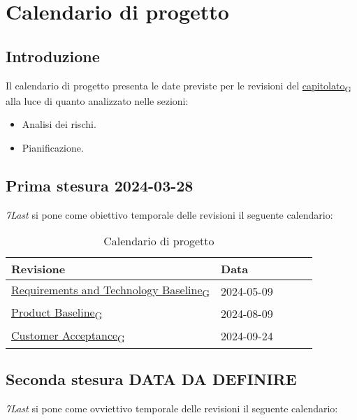 \section{Calendario di progetto}
\subsection{Introduzione}
Il calendario di progetto presenta le date previste per le revisioni del \href{https://7last.github.io/docs/rtb/documentazione-interna/glossario#capitolato}{capitolato\textsubscript{G}} alla luce di quanto analizzato nelle sezioni:
\begin{itemize}
    \item Analisi dei rischi. 
    \item Pianificazione.
\end{itemize}

\subsection{Prima stesura 2024-03-28}
\textit{7Last} si pone come obiettivo temporale delle revisioni il seguente calendario:
\begin{table}[!h]
    \begin{center}
        \begin{tabular}{ |l |l |l |l| l| }
            \hline 
            Revisione                               & Data       \\ \hline
            \href{https://7last.github.io/docs/rtb/documentazione-interna/glossario#requirements-and-technology-baseline}{Requirements and Technology Baseline\textsubscript{G}}    & 2024-05-09 \\
            \href{https://7last.github.io/docs/rtb/documentazione-interna/glossario#product-baseline}{Product Baseline\textsubscript{G}}                        & 2024-08-09 \\
            \href{https://7last.github.io/docs/rtb/documentazione-interna/glossario#customer-acceptance}{Customer Acceptance\textsubscript{G}}                     & 2024-09-24 \\
            \hline
        \end{tabular}
    \end{center}
    \caption{Calendario di progetto}
    \label{tab:1}
\end{table}
\newpage

\subsection{Seconda stesura DATA DA DEFINIRE}
\textit{7Last} si pone come ovviettivo temporale delle revisioni il seguente calendario:

